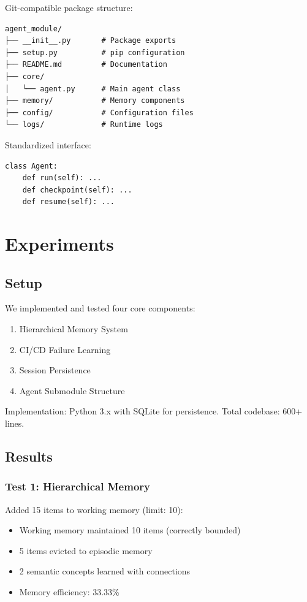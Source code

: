 \documentclass{article}
\begin{document}
Git-compatible package structure:
\begin{verbatim}
agent_module/
├── __init__.py       # Package exports
├── setup.py          # pip configuration
├── README.md         # Documentation
├── core/
│   └── agent.py      # Main agent class
├── memory/           # Memory components
├── config/           # Configuration files
└── logs/             # Runtime logs
\end{verbatim}

Standardized interface:
\begin{verbatim}
class Agent:
    def run(self): ...
    def checkpoint(self): ...
    def resume(self): ...
\end{verbatim}

\section{Experiments}

\subsection{Setup}

We implemented and tested four core components:
\begin{enumerate}
    \item Hierarchical Memory System
    \item CI/CD Failure Learning
    \item Session Persistence
    \item Agent Submodule Structure
\end{enumerate}

Implementation: Python 3.x with SQLite for persistence. Total codebase: 600+ lines.

\subsection{Results}

\subsubsection{Test 1: Hierarchical Memory}

Added 15 items to working memory (limit: 10):
\begin{itemize}
    \item Working memory maintained 10 items (correctly bounded)
    \item 5 items evicted to episodic memory
    \item 2 semantic concepts learned with connections
    \item Memory efficiency: 33.33\%
\end{itemize}
\end{document}
